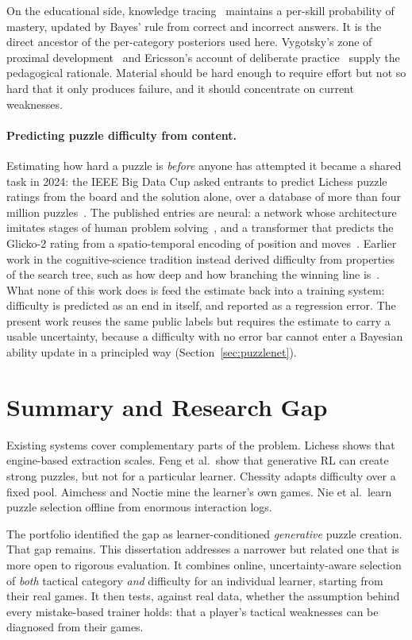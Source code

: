 On the educational side, knowledge tracing~\cite{corbett1995knowledge} maintains a per-skill
probability of mastery, updated by Bayes' rule from correct and incorrect answers. It is the direct
ancestor of the per-category posteriors used here. Vygotsky's zone of proximal
development~\cite{vygotsky1978mind} and Ericsson's account of deliberate practice~\cite{ericsson1993role}
supply the pedagogical rationale. Material should be hard enough to require effort but not so hard
that it only produces failure, and it should concentrate on current weaknesses.

\paragraph{Predicting puzzle difficulty from content.} Estimating how hard a puzzle is \emph{before}
anyone has attempted it became a shared task in 2024: the IEEE Big Data Cup asked entrants to predict
Lichess puzzle ratings from the board and the solution alone, over a database of more than four
million puzzles~\cite{zysko2024bigdatacup}. The published entries are neural: a network whose
architecture imitates stages of human problem solving~\cite{schutt2024estimating}, and a transformer
that predicts the Glicko-2 rating from a spatio-temporal encoding of position and moves~\cite{milosz2024transformers}.
Earlier work in the cognitive-science tradition instead derived difficulty from properties of the search
tree, such as how deep and how branching the winning line is~\cite{hristova2014assessing,bratko2021predicting}.
What none of this work does is feed the estimate back into a training system: difficulty is predicted as
an end in itself, and reported as a regression error. The present work reuses the same public labels but
requires the estimate to carry a usable uncertainty, because a difficulty with no error bar cannot enter
a Bayesian ability update in a principled way (Section~\ref{sec:puzzlenet}).

\section{Summary and Research Gap}

Existing systems cover complementary parts of the problem. Lichess shows that engine-based
extraction scales. Feng et al.\ show that generative RL can create strong puzzles, but not for a
particular learner. Chessity adapts difficulty over a fixed pool. Aimchess and Noctie mine the
learner's own games. Nie et al.\ learn puzzle selection offline from enormous interaction logs.

The portfolio identified the gap as learner-conditioned \emph{generative} puzzle creation. That gap
remains. This dissertation addresses a narrower but related one that is more open to rigorous
evaluation. It combines online, uncertainty-aware selection of \emph{both} tactical category
\emph{and} difficulty for an individual learner, starting from their real games. It then tests,
against real data, whether the assumption behind every mistake-based trainer holds: that a
player's tactical weaknesses can be diagnosed from their games.
